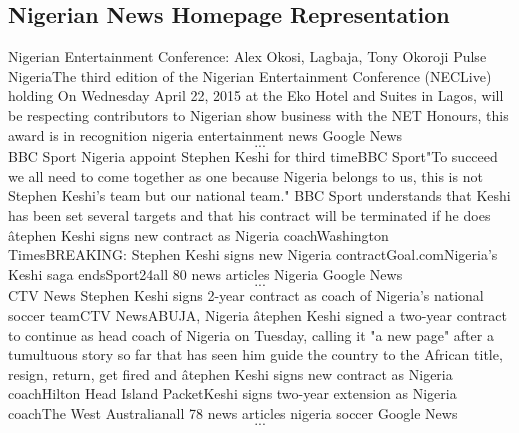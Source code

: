 \documentclass[a4paper,12pt]{article}
\begin{document}
\begin{appendices}
\subsection{Nigerian News Homepage Representation}
Nigerian Entertainment Conference: Alex Okosi, Lagbaja, Tony Okoroji Pulse NigeriaThe third edition of the Nigerian Entertainment Conference (NECLive) holding On Wednesday April 22, 2015 at the Eko Hotel and Suites in Lagos, will be respecting contributors to Nigerian show business with the NET Honours, this award is in recognition nigeria entertainment news Google News \[...\]
BBC Sport Nigeria appoint Stephen Keshi for third timeBBC Sport"To succeed we all need to come together as one because Nigeria belongs to us, this is not Stephen Keshi's team but our national team." BBC Sport understands that Keshi has been set several targets and that his contract will be terminated if he does âtephen Keshi signs new contract as Nigeria coachWashington TimesBREAKING: Stephen Keshi signs new Nigeria contractGoal.comNigeria's Keshi saga endsSport24all 80 news articles Nigeria Google News \[...\]
CTV News Stephen Keshi signs 2-year contract as coach of Nigeria's national soccer teamCTV NewsABUJA, Nigeria âtephen Keshi signed a two-year contract to continue as head coach of Nigeria on Tuesday, calling it "a new page" after a tumultuous story so far that has seen him guide the country to the African title, resign, return, get fired and âtephen Keshi signs new contract as Nigeria coachHilton Head Island PacketKeshi signs two-year extension as Nigeria coachThe West Australianall 78 news articles nigeria soccer Google News \[...\]


\end{appendices}


\clearpage


\end{document}
